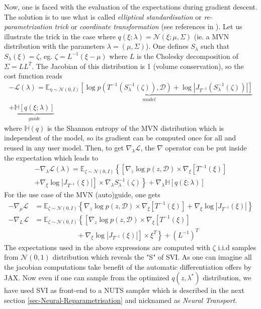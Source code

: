 \documentclass[final,5p,times,twocolumn,authoryear]{elsarticle}
\newcommand{\nn}{\nonumber}
\begin{document}
Now, one is faced with the evaluation of the expectations during gradient descent. The solution is to use what is called \textit{elliptical standardisation} or \textit{re-parametrization trick} or \textit{coordinate transformation} (see references in \citep{2015arXiv150603431K}). Let us illustrate the trick in the case where $q(\xi; \lambda) = \mathcal{N}(\xi; \mu, \Sigma)$ (ie. a MVN distribution with the parameters $\lambda=(\mu, \Sigma)$). One defines $S_\lambda$ such that $S_\lambda(\xi)=\zeta$, eg. $\zeta = L^{-1}(\xi-\mu)$ where $L$ is the Cholesky decomposition of $\Sigma=LL^T$. The Jacobian of this distribution is 1 (volume conservation), so the cost function reads
\begin{multline}
-\mathcal{L}(\lambda) = \underbrace{\mathbb{E}_{\eta\sim \mathcal{N}(0,I)}\left[ \log p(T^{-1}(S_\lambda^{-1}(\zeta)),\mathcal{D}) + \log |J_{T^{-1}}(S_\lambda^{-1}(\zeta))| \right]}_{model} \\ + \underbrace{\mathbb{H}[q(\xi;\lambda)]}_{guide}
\label{eq-loss-svi-3}
\end{multline}
where $\mathbb{H}(q)$ is the Shannon entropy of the MVN distribution which is independent of the model, so its gradient can be computed once for all and reused in any user model. Then,
to get $\nabla_\lambda \mathcal{L}$, the $\nabla$ operator can be put inside the expectation which leads to
\begin{multline}
-\nabla_\lambda\mathcal{L}(\lambda) = \mathbb{E}_{\zeta\sim \mathcal{N}(0,I)}\left\{
\left[ \nabla_z \log p(z,\mathcal{D}) \times \nabla_\xi[T^{-1}(\xi)] \right. \right. \\
+ \left. \left. \nabla_\xi \log|J_{T^{-1}}(\xi)| \right] \times \nabla_\lambda S_\lambda^{-1}(\zeta)
\right\}
+ \nabla_\lambda \mathbb{H}[q(\xi;\lambda)]
\label{eq-loss-svi-4}
\end{multline}
For the use case of the MVN (auto)guide, one gets
\begin{align}
-\nabla_\mu \mathcal{L} &= \mathbb{E}_{\zeta\sim \mathcal{N}(0,I)}\left\{
\nabla_z \log p(z,\mathcal{D}) \times \nabla_\xi[T^{-1}(\xi)]
+ \nabla_\xi \log|J_{T^{-1}}(\xi)|
\right\} \nn \\
-\nabla_L \mathcal{L} &= \mathbb{E}_{\zeta\sim \mathcal{N}(0,I)}\left\{
\left[ \nabla_z \log p(z,\mathcal{D}) \times \nabla_\xi[T^{-1}(\xi)] \right.\right. \nn\\
&\left. \left. \qquad\qquad\qquad + \nabla_\xi \log|J_{T^{-1}}(\xi)| \right] \times \xi^T 
\right\}+ (L^{-1})^T
\end{align}
The expectations used in the above expressions are computed with $\zeta$ i.i.d samples from $\mathcal{N}(0,1)$ distribution which reveals the "S" of SVI. As one can imagine all the jacobian computations take benefit of the automatic differentiation offers by JAX. Now even if one can sample from the optimized  $q(z,\lambda^\ast)$ distribution, we have used SVI as front-end to a NUTS sampler which is described in the next section \ref{sec-Neural-Reparametrisation} and nicknamed as \textit{Neural Transport}.
%
\end{document}
